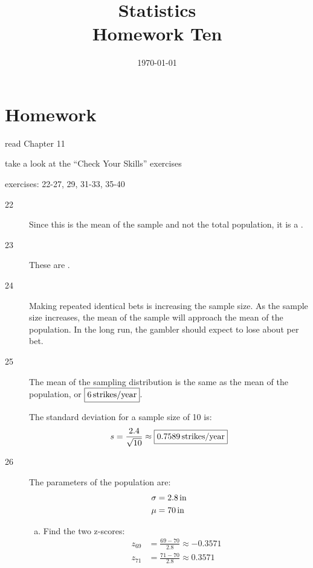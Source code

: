 \documentclass[letterpaper, landscape]{exam}
\title{Statistics \\ Homework Ten}
\date{\today}
\author{}
\newcommand{\cent}{\textcent\xspace}
\begin{document}
  \maketitle

  \section{Homework}
  \ifprintanswers
  \else
    \begin{itemize*}
      \item read Chapter 11 
      \item take a look at the ``Check Your Skills'' exercises
      \item exercises: 22-27, 29, 31-33, 35-40
    \end{itemize*}
  \fi

  \ifprintanswers
    \begin{description}

      \item[22] Since this is the mean of the sample and not the total
        population, it is a .

      \item[23] These are .

      \item[24] Making repeated identical bets is increasing the sample size.
        As the sample size increases, the mean of the sample will approach the
        mean of the population. In the long run, the gambler should expect to
        lose about \fbox{ 5.3\cent } per bet.

      \item[25] The mean of the sampling distribution is the same as the mean of
        the population, or $\boxed{ \unit[6]{strikes/year} }$.

        The standard deviation for a sample size of 10 is:
        \[
          s = \frac{2.4}{\sqrt{10}} \approx \boxed{ \unit[0.7589]{strikes/year} }
        \]

      \item[26]
        The parameters of the population are:
        \begin{align*}
          \sigma & = \unit[2.8]{in} \\
          \mu    & = \unit[70]{in} \\
        \end{align*}

        \begin{enumerate}[(a)]
          \item Find the two z-scores:
            \begin{align*}
              z_{69} &= \frac{69 - 70}{2.8} \approx -0.3571 \\
              z_{71} &= \frac{71 - 70}{2.8} \approx 0.3571 \\
            \end{align*}


\end{enumerate}
\end{description}
\end{document}
